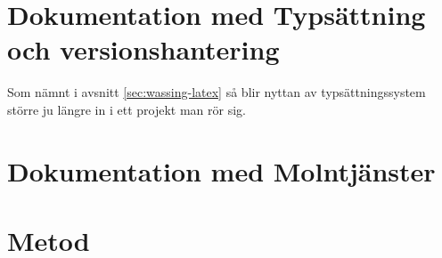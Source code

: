 \section{Dokumentation med Typsättning och versionshantering}
Som nämnt i avsnitt \ref{sec:wassing-latex} så blir nyttan av typsättningssystem större ju längre in i ett projekt man rör sig.

\section{Dokumentation med Molntjänster}


\section{Metod}
\label{sec:wassing-discussion-method}




